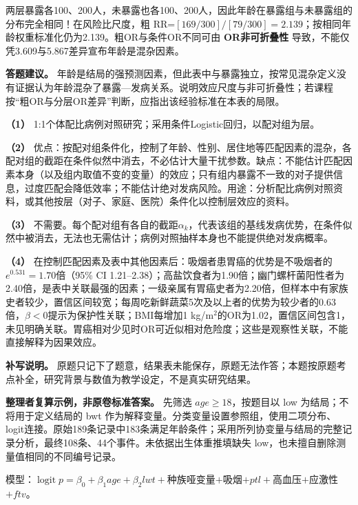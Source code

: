 两层暴露各100、200人，未暴露也各100、200人，因此年龄在暴露组与未暴露组的分布完全相同！在风险比尺度，粗 RR=\([169/300]/[79/300]=2.139\)；按相同年龄权重标准化仍为2.139。粗OR与条件OR不同可由 \textbf{OR非可折叠性} 导致，不能仅凭3.609与5.867差异宣布年龄是混杂因素。

\textbf{答题建议。} 年龄是结局的强预测因素，但此表中与暴露独立，按常见混杂定义没有证据认为年龄混杂了暴露---发病关系。说明效应尺度与非可折叠性；若课程按``粗OR与分层OR差异''判断，应指出该经验标准在本表的局限。



\textbf{（1）} 1:1个体配比病例对照研究；采用条件Logistic回归，以配对组为层。

\textbf{（2）} 优点：按配对组条件化，控制了年龄、性别、居住地等匹配因素的混杂，各配对组的截距在条件似然中消去，不必估计大量干扰参数。缺点：不能估计匹配因素本身（以及组内取值不变的变量）的效应；只有组内暴露不一致的对子提供信息，过度匹配会降低效率；不能估计绝对发病风险。用途：分析配比病例对照资料，或其他按层（对子、家庭、医院）条件化以控制层效应的资料。

\textbf{（3）} 不需要。每个配对组有各自的截距\(\alpha_k\)，代表该组的基线发病优势，在条件似然中被消去，无法也无需估计；病例对照抽样本身也不能提供绝对发病概率。

\textbf{（4）} 在控制匹配因素及表中其他因素后：吸烟者患胃癌的优势是不吸烟者的\(e^{0.531}=1.70\)倍（95\% CI 1.21--2.38）；高盐饮食者为1.90倍；幽门螺杆菌阳性者为2.40倍，是表中关联最强的因素；一级亲属有胃癌史者为2.20倍，但样本中有家族史者较少，置信区间较宽；每周吃新鲜蔬菜5次及以上者的优势为较少者的0.63倍，\(\beta<0\)提示为保护性关联；BMI每增加1 kg/m\(^2\)的OR为1.02，置信区间包含1，未见明确关联。胃癌相对少见时OR可近似相对危险度；这些是观察性关联，不能直接解释为因果效应。

\textbf{补写说明。} 原题只记下了题意，结果表未能保存，原题无法作答；本题按原题考点补全，研究背景与数值为教学设定，不是真实研究结果。



\textbf{整理者复算示例，非原卷标准答案。} 先筛选 \(age\ge18\)，按题目以 low 为结局；不将用于定义结局的 bwt 作为解释变量。分类变量设置参照组，使用二项分布、logit连接。原始189条记录中183条满足年龄条件；采用所列协变量与结局的完整记录分析，最终108条、44个事件。未依据出生体重推填缺失 low，也未擅自删除测量值相同的不同编号记录。

模型：\(\operatorname{logit}p=\beta_0+\beta_1age+\beta_2lwt+\)种族哑变量\(+\)吸烟\(+ptl+\)高血压\(+\)应激性\(+ftv\)。

